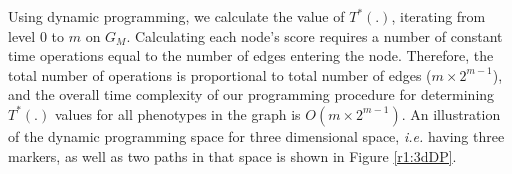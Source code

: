 Using dynamic programming, we calculate the value of $T^*(.)$, iterating from level $0$ to $m$ on $G_M$.
Calculating each node's score requires a number of constant time operations equal to the number of edges entering the
node.  Therefore, the total number of operations is proportional to total number of edges ($m \times 2^{m-1}$), and the
overall time complexity of our programming procedure for determining $T^*(.)$ values for all phenotypes in the graph is
$O(m \times 2^{m-1})$.
An illustration of the dynamic programming space for three dimensional space, \emph{i.e.} having three markers, as well as 
two paths in that space is shown in Figure \ref{r1:3dDP}.


